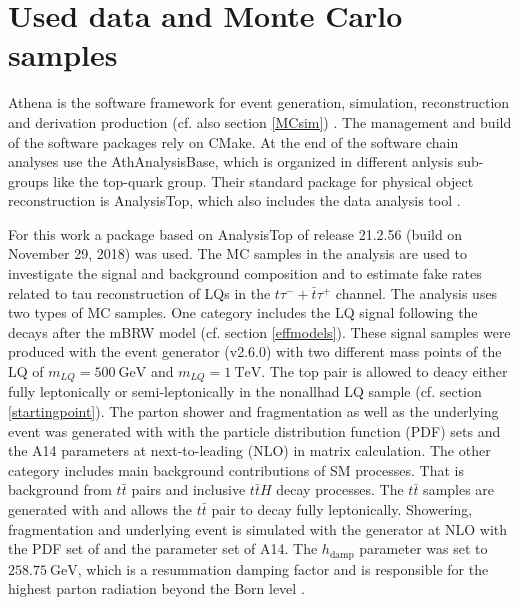 \section{Used data and Monte Carlo samples}\label{MCsamples}
Athena is the {\ATLAS} software framework for event generation, simulation, reconstruction and derivation production (cf. also section \ref{MCsim}) \cite{Athena}. The management and build of the software packages rely on CMake. At the end of the software chain analyses use the AthAnalysisBase, which is organized in different anlysis sub-groups like the top-quark group. Their standard package for physical object reconstruction is AnalysisTop, which also includes the data analysis tool {\ROOT}.\par
For this work a package based on AnalysisTop of release 21.2.56 (build on November 29, 2018) was used.\newline
The MC samples in the analysis are used to investigate the signal and background composition and to estimate fake rates related to tau reconstruction of LQs in the $t\tau^{-}+\bar{t}\tau^{+}$ channel. The analysis uses two types of MC samples. One category includes the LQ signal following the decays after the mBRW model (cf. section \ref{effmodels}). These signal samples were produced with the event generator {\aMCNLO} (v2.6.0) \cite{aMCNlo} with two different mass points of the LQ of $m_{LQ}=\SI{500}{\giga\electronvolt}$ and $m_{LQ}=\SI{1}{\tera\electronvolt}$. The top pair is allowed to deacy either fully leptonically or semi-leptonically in the nonallhad LQ sample (cf. section \ref{startingpoint}). The parton shower and fragmentation as well as the underlying event was generated with {\Pythia} \cite{Pythia8} with the particle distribution function (PDF) sets {\NNPDFd} \cite{NNPDF} and the A14 \cite{A14} parameters at next-to-leading (NLO) in matrix calculation. \newline         
The other category includes main background contributions of SM processes. That is background from $t\bar{t}$ pairs and inclusive $t\bar{t}H$ decay processes. The $t\bar{t}$ samples are generated with {\POWHEG} \cite{Powheg} and allows the $t\bar{t}$ pair to decay fully leptonically. Showering, fragmentation and underlying event is simulated with the generator {\Pythia} at NLO with the PDF set of {\NNPDFz} and the parameter set of A14. The $h_\text{damp}$ parameter was set to $\SI{258.75}{\giga\electronvolt}$, which is a resummation damping factor and is responsible for the highest parton radiation beyond the Born level \cite{hdamp}.\newline
